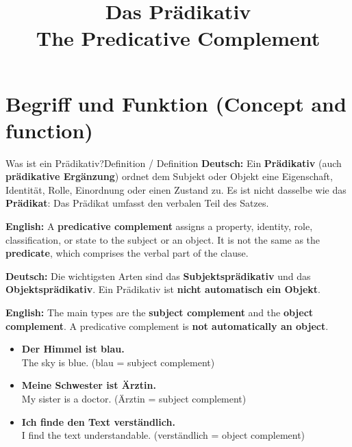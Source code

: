 \documentclass[a4paper,11pt]{article}
\title{Das Prädikativ\\\large\textnormal{The Predicative Complement}}
\date{}
\newcommand{\GermanText}[1]{\textbf{Deutsch: }#1\par}
\newcommand{\EnglishText}[1]{{\small\color{SoftGray}\textbf{English: }#1\par}}
\newcommand{\ExampleItem}[2]{\item \textbf{#1}\\{\small\color{SoftGray}#2}}
\begin{document}
\maketitle
\tableofcontents
\newpage

\section{Begriff und Funktion \textnormal{(Concept and function)}}
\begin{grammarentry}{Was ist ein Prädikativ?}{Definition / Definition}
\GermanText{Ein \textbf{Prädikativ} (auch \textbf{prädikative Ergänzung}) ordnet dem Subjekt oder Objekt eine Eigenschaft, Identität, Rolle, Einordnung oder einen Zustand zu. Es ist nicht dasselbe wie das \textbf{Prädikat}: Das Prädikat umfasst den verbalen Teil des Satzes.}
\EnglishText{A \textbf{predicative complement} assigns a property, identity, role, classification, or state to the subject or an object. It is not the same as the \textbf{predicate}, which comprises the verbal part of the clause.}
\GermanText{Die wichtigsten Arten sind das \textbf{Subjektsprädikativ} und das \textbf{Objektsprädikativ}. Ein Prädikativ ist \textbf{nicht automatisch ein Objekt}.}
\EnglishText{The main types are the \textbf{subject complement} and the \textbf{object complement}. A predicative complement is \textbf{not automatically an object}.}
\end{grammarentry}
\begin{exbox}\begin{itemize}
\ExampleItem{Der Himmel ist blau.}{The sky is blue. (blau = subject complement)}
\ExampleItem{Meine Schwester ist Ärztin.}{My sister is a doctor. (Ärztin = subject complement)}
\ExampleItem{Ich finde den Text verständlich.}{I find the text understandable. (verständlich = object complement)}
\end{itemize}\end{exbox}
\end{document}
